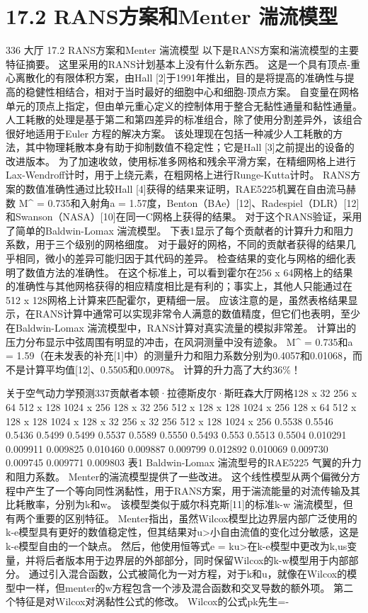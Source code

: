 \documentclass[UTF8,11pt,a4paper,openany,fontset=fandol]{ctexbook}
\begin{document}
\section{17.2 RANS方案和Menter 湍流模型}
336 大厅 17.2 RANS方案和Menter 湍流模型 以下是RANS方案和湍流模型的主要特征摘要。 这里采用的RANS计划基本上没有什么新东西。 这是一个具有顶点-重心离散化的有限体积方案，由Hall [2]于1991年推出，目的是将提高的准确性与提高的稳健性相结合，相对于当时最好的细胞中心和细胞-顶点方案。 自变量在网格单元的顶点上指定，但由单元重心定义的控制体用于整合无黏性通量和黏性通量。 人工耗散的处理是基于第二和第四差异的标准组合，除了使用分割差异外，该组合很好地适用于Euler 方程的解决方案。 该处理现在包括一种减少人工耗散的方法，其中物理耗散本身有助于抑制数值不稳定性；它是Hall [3]之前提出的设备的改进版本。 为了加速收敛，使用标准多网格和残余平滑方案，在精细网格上进行Lax-Wendroff计时，用于上绕元素，在粗网格上进行Runge-Kutta计时。 RANS方案的数值准确性通过比较Hall [4]获得的结果来证明，RAE5225机翼在自由流马赫数 M\textasciicircum{} = 0.735和入射角a = 1.57度，Benton（BAe）[12]、Radespiel（DLR）[12]和Swanson（NASA）[10]在同一C网格上获得的结果。 对于这个RANS验证，采用了简单的Baldwin-Lomax 湍流模型。 下表1显示了每个贡献者的计算升力和阻力系数，用于三个级别的网格细度。 对于最好的网格，不同的贡献者获得的结果几乎相同，微小的差异可能归因于其代码的差异。 检查结果的变化与网格的细化表明了数值方法的准确性。 在这个标准上，可以看到霍尔在256 x 64网格上的结果的准确性与其他网格获得的相应精度相比是有利的；事实上，其他人只能通过在512 x 128网格上计算来匹配霍尔，更精细一层。 应该注意的是，虽然表格结果显示，在RANS计算中通常可以实现非常令人满意的数值精度，但它们也表明，至少在Baldwin-Lomax 湍流模型中，RANS计算对真实流量的模拟非常差。 计算出的压力分布显示中弦周围有明显的冲击，在风洞测量中没有迹象。 M\textasciicircum{} = 0.735和a = 1.59（在未发表的补充[1]中）的测量升力和阻力系数分别为0.4057和0.01068，而不是计算平均值[12]、0.5505和0.00978。 计算的升力高了大约36\%！

关于空气动力学预测337贡献者本顿·拉德斯皮尔·斯旺森大厅网格128 x 32 256 x 64 512 x 128 1024 x 256 128 x 32 256 512 x 128 x 128 1024 x 256 128 x 64 512 x 128 x 128 1024 x 128 x 32 256 x 32 256 512 x 128 1024 x 256 0.5538 0.5546 0.5436 0.5499 0.5499 0.5537 0.5589 0.5550 0.5493 0.553 0.5513 0.5504 0.010291 0.009911 0.009825 0.010460 0.009887 0.009799 0.012892 0.010069 0.009730 0.009745 0.009771 0.009803 表1 Baldwin-Lomax 湍流型号的RAE5225 气翼的升力和阻力系数。 Menter的湍流模型提供了一些改进。 这个线性模型从两个偏微分方程中产生了一个等向同性涡黏性，用于RANS方案，用于湍流能量的对流传输及其比耗散率，分别为k和w。 该模型类似于威尔科克斯[11]的标准k-w 湍流模型，但有两个重要的区别特征。 Menter指出，虽然Wilcox模型比边界层内部广泛使用的k-e模型具有更好的数值稳定性，但其结果对u>小自由流值的变化过分敏感，这是k-e模型自由的一个缺点。 然后，他使用恒等式e = ku>在k-e模型中更改为k,us变量，并将后者版本用于边界层的外部部分，同时保留Wilcox的k-w模型用于内部部分。 通过引入混合函数，公式被简化为一对方程，对于k和u，就像在Wilcox的模型中一样，但menter的w方程包含一个涉及混合函数和交叉导数的额外项。 第二个特征是对Wilcox对涡黏性公式的修改。 Wilcox的公式pk先生=-
\end{document}
